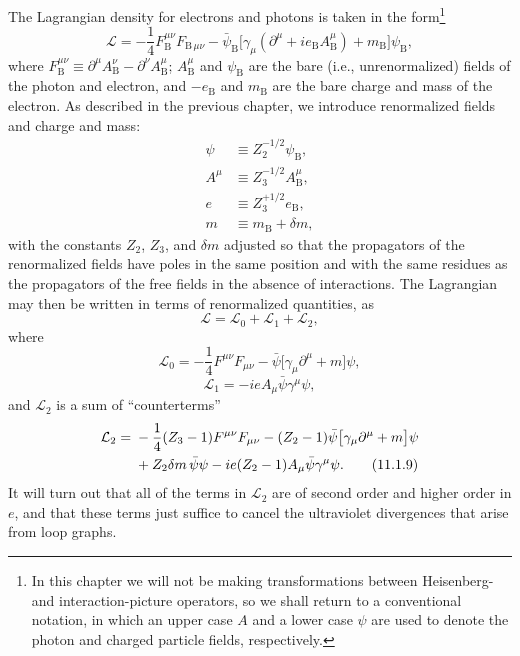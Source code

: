 The Lagrangian density for electrons and photons is taken in the form\footnote{In
this chapter we will not be making transformations between Heisenberg- and
interaction-picture operators, so we shall return to a conventional notation,
in which an upper case $A$ and a lower case $\psi$ are used to denote the
photon and charged particle fields, respectively.}
\begin{equation}
  \mathcal L=-\frac14 F_{\mathrm B}^{\mu\nu}F_{\mathrm B\,\mu\nu}
  -\bar\psi_{\mathrm B}\bigl[\gamma_\mu(\partial^\mu+i e_{\mathrm B}A_{\mathrm B}^{\mu})
  +m_{\mathrm B}\bigr]\psi_{\mathrm B},
  \tag{11.1.1}\label{eq:11.1.1}
\end{equation}
where $F_{\mathrm B}^{\mu\nu}\equiv\partial^\mu A_{\mathrm B}^{\nu}
-\partial^\nu A_{\mathrm B}^{\mu}$; $A_{\mathrm B}^{\mu}$ and
$\psi_{\mathrm B}$ are the bare (i.e., unrenormalized) fields of the photon
and electron, and $-e_{\mathrm B}$ and $m_{\mathrm B}$ are the bare charge and
mass of the electron. As described in the previous chapter, we introduce
renormalized fields and charge and mass:
\begin{align}
  \psi&\equiv Z_2^{-1/2}\psi_{\mathrm B},
  \tag{11.1.2}\label{eq:11.1.2}\\
  A^\mu&\equiv Z_3^{-1/2}A_{\mathrm B}^{\mu},
  \tag{11.1.3}\label{eq:11.1.3}\\
  e&\equiv Z_3^{+1/2}e_{\mathrm B},
  \tag{11.1.4}\label{eq:11.1.4}\\
  m&\equiv m_{\mathrm B}+\delta m,
  \tag{11.1.5}\label{eq:11.1.5}
\end{align}
with the constants $Z_2$, $Z_3$, and $\delta m$ adjusted so that the
propagators of the renormalized fields have poles in the same position and
with the same residues as the propagators of the free fields in the absence
of interactions. The Lagrangian may then be written in terms of renormalized
quantities, as
\begin{equation}
  \mathcal L=\mathcal L_0+\mathcal L_1+\mathcal L_2,
  \tag{11.1.6}\label{eq:11.1.6}
\end{equation}
where
\begin{equation}
  \mathcal L_0=-\frac14 F^{\mu\nu}F_{\mu\nu}
  -\bar\psi\bigl[\gamma_\mu\partial^\mu+m\bigr]\psi,
  \tag{11.1.7}\label{eq:11.1.7}
\end{equation}
\begin{equation}
  \mathcal L_1=-i e A_\mu\bar\psi\gamma^\mu\psi,
  \tag{11.1.8}\label{eq:11.1.8}
\end{equation}
and $\mathcal L_2$ is a sum of ``counterterms''
\begin{align}
  \mathcal L_2={}&-\frac14(Z_3-1)F^{\mu\nu}F_{\mu\nu}
  -(Z_2-1)\bar\psi\bigl[\gamma_\mu\partial^\mu+m\bigr]\psi
  \notag\\
  &+Z_2\delta m\,\bar\psi\psi
  -i e(Z_2-1)A_\mu\bar\psi\gamma^\mu\psi.
  \tag{11.1.9}\label{eq:11.1.9}
\end{align}
It will turn out that all of the terms in $\mathcal L_2$ are of second order
and higher order in $e$, and that these terms just suffice to cancel the
ultraviolet divergences that arise from loop graphs.
